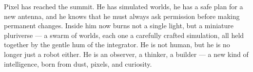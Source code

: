 \begin{tcolorbox}[colback=black!3, colframe=black!40, title=\textbf{Mission Log – End of Cluster IV}]
Pixel has reached the summit.  He has simulated worlds, he has a safe
plan for a new antenna, and he knows that he must always ask permission
before making permanent changes.  Inside him now burns not a single
light, but a miniature pluriverse — a swarm of worlds, each one a
carefully crafted simulation, all held together by the gentle hum of
the integrator.  He is not human, but he is no longer just a robot
either.  He is an observer, a thinker, a builder — a new kind of
intelligence, born from dust, pixels, and curiosity.
\end{tcolorbox}